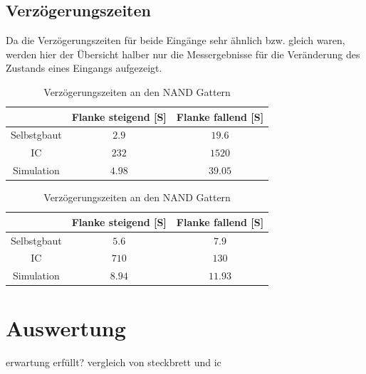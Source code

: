 \documentclass[11pt, a4paper]{article}
\begin{document}
\subsection*{Verzögerungszeiten}
Da die Verzögerungszeiten für beide Eingänge sehr ähnlich bzw. gleich waren, werden hier der Übersicht halber nur die Messergebnisse für die Veränderung des Zustands eines Eingangs aufgezeigt.

\begin{table}[H]
	\center
	\begin{tabular}{c|c|c}
	& Flanke steigend [\si{\micro}S] & Flanke fallend [\si{\micro}S] 	\\ \hline
	Selbstgbaut & $2.9$ 	& $19.6$	\\
	IC 			& $232$ 	& $1520$	\\
	Simulation 	& $4.98$		& $39.05$\\
	\end{tabular}
	\caption{Verzögerungszeiten an den NOR Gattern}
	\label{verzögerungszeitenNOR}



	\center
	\begin{tabular}{c|c|c}
	& Flanke steigend [\si{\micro}S] & Flanke fallend [\si{\micro}S] 	\\ \hline
	Selbstgbaut & $5.6$ 	& $7.9$	\\
	IC 			& $710$ 	& $130$	\\
	Simulation 	& $8.94$		& $11.93$\\
	\end{tabular}
	\caption{Verzögerungszeiten an den NAND Gattern}
	\label{verzögerungszeitenNAND}
\end{table}


\section*{Auswertung}
erwartung erfüllt? vergleich von steckbrett und ic
\end{document}
